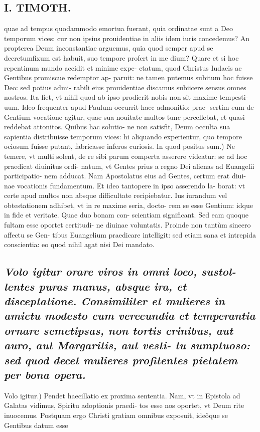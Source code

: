 \documentclass{article}
\begin{document}
\begin{pages}
\section*{I. TIMOTH. }
\marginpar{[ p.24 ]}\pstart quae ad tempus quodammodo emortua fuerant, quia ordinatae sunt a Deo temporum vices: cur non ipsius prouidentiae in aliis idem iuris concedemus? An propterea Deum inconstantiae arguemus, quia quod semper apud se decretumfixum est habuit, suo tempore profert in me dium? Quare et si hoc repentinum mundo accidit et minime expe- ctatum, quod Christus Iudaeis ac Gentibus promiscue redemptor ap- paruit: ne tamen putemus subitum hoc fuisse Deo: sed potius admi- rabili eius prouidentiae discamus subiicere sensus omnes nostros. Ita fiet, vt nihil quod ab ipso prodierit nobis non sit maxime tempesti- uum. Ideo frequenter apud Paulum occurrit haec admonitio: prae- sertim eum de Gentium vocatione agitur, quae sua nouitate multos tunc percellebat, et quasi reddebat attonitos. Quibus hac solutio- ne non satisfit, Deum occulta sua sapientia distribuisse temporum vices: hi aliquando experientur, quo tempore ociosum fuisse putant, fabricasse inferos curiosis.  \pend\pstart In quod positus sum.) Ne temere, vt multi solent, de re sibi parum comperta asserere videatur: se ad hoc praedicat diuinitus ordi- natum, vt Gentes prius a regno Dei alienas ad Euangelii participatio- nem adducat. Nam Apostolatus eius ad Gentes, certum erat diui- nae vocationis fundamentum. Et ideo tantopere in ipso asserendo la- borat: vt certe apud multos non absque difficultate recipiebatur. Ius iurandum vel obtestationem adhibet, vt in re maxime seria, docto- rem se esse Gentium: idque in fide et veritate. Quae duo bonam con- scientiam significant. Sed eam quoque fultam esse oportet certitudi- ne diuinae voluntatis. Proinde non tantùm sincero affectu se Gen- tibus Euangelium praedicare intelligit: sed etiam sana et intrepida conscientia: eo quod nihil agat nisi Dei mandato.  \pend
{}
{}
\subsection*{\textit{Volo igitur orare viros in omni loco, sustol- lentes puras manus, absque ira, et disceptatione. Consimiliter et mulieres in amictu modesto cum verecundia et temperantia ornare semetipsas, non tortis crinibus, aut auro, aut Margaritis, aut vesti- tu sumptuoso: sed quod decet mulieres profitentes pietatem per bona opera. }}\pstart Volo igitur.) Pendet haecillatio ex proxima sententia. Nam, vt in Epistola ad Galatas vidimus, Spiritu adoptionis praedi- tos esse nos oportet, vt Deum rite inuocemus. Postquam ergo Christi gratiam omnibus exposuit, ideôque se Gentibus datum esse  \pend

\end{pages}
\end{document}
